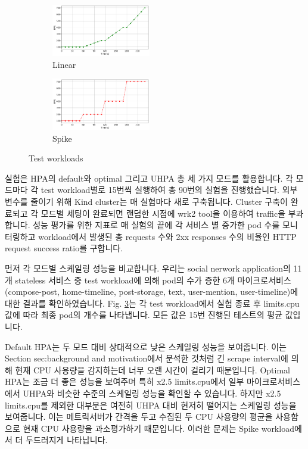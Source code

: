 \documentclass[conference]{IEEEtran}
\begin{document}
\begin{figure}[tb]
    \centering
    \begin{subfigure}{4.3cm}
        \includegraphics[width=4.3cm]{images/evaluation/linear_test_workload.png}
        \caption{Linear}
        \label{fig:test workloads linear}
    \end{subfigure}
    \begin{subfigure}{4.3cm}
        \includegraphics[width=4.3cm]{images/evaluation/spike_test_workload.png}
        \caption{Spike}
        \label{fig:test workloads spike}
    \end{subfigure}
    \caption{Test workloads}
    \label{fig:test workloads}
\end{figure}



실험은 HPA의 default와 optimal 그리고 UHPA 총 세 가지 모드를 활용합니다. 각 모드마다 각 test workload별로 15번씩 실행하여 총 90번의 실험을 진행했습니다. 외부 변수를 줄이기 위해 Kind cluster는 매 실험마다 새로 구축됩니다. Cluster 구축이 완료되고 각 모드별 세팅이 완료되면 랜덤한 시점에 wrk2 tool을 이용하여 traffic을 부과합니다. 성능 평가를 위한 지표로 매 실험의 끝에 각 서비스 별 증가한 pod 수를 모니터링하고 workload에서 발생된 총 requests 수와 2xx responses 수의 비율인 HTTP request success ratio를 구합니다.

먼저 각 모드별 스케일링 성능을 비교합니다. 우리는 social nerwork application의 11개 stateless 서비스 중 test workload에 의해 pod의 수가 증한 6개 마이크로서비스(compose-post, home-timeline, post-storage, text, user-mention, user-timeline)에 대한 결과를 확인하였습니다. Fig. \ref{fig:test workloads}는 각 test workload에서 실험 종료 후 limits.cpu 값에 따라 최종 pod의 개수를 나타냅니다. 모든 값은 15번 진행된 테스트의 평균 값입니다.

Default HPA는 두 모드 대비 상대적으로 낮은 스케일링 성능을 보여줍니다. 이는 Section {sec:background and motivation}에서 분석한 것처럼 긴 scrape interval에 의해 현재 CPU 사용량을 감지하는데 너무 오랜 시간이 걸리기 때문입니다. Optimal HPA는 조금 더 좋은 성능을 보여주며 특히 x2.5 limits.cpu에서 일부 마이크로서비스에서 UHPA와 비슷한 수준의 스케일링 성능을 확인할 수 있습니다. 하지만 x2.5 limits.cpu를 제외한 대부분은 여전히 UHPA 대비 현저히 떨어지는 스케일링 성능을 보여줍니다. 이는 메트릭서버가 간격을 두고 수집된 두 CPU 사용량의 평균을 사용함으로 현재 CPU 사용량을 과소평가하기 때문입니다. 이러한 문제는 Spike workload에서 더 두드러지게 나타납니다.
\end{document}
